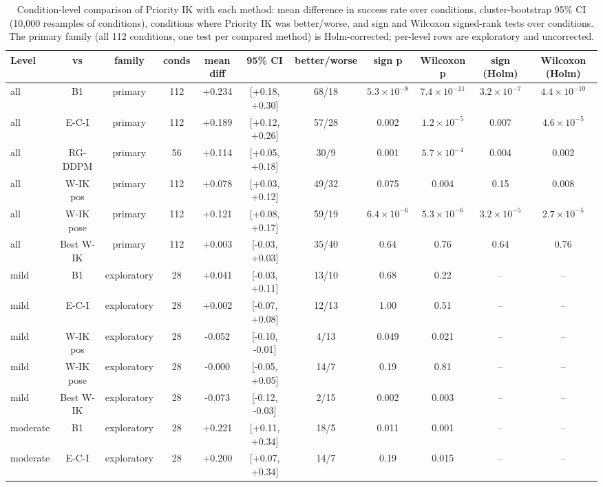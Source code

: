 \begin{table}[t]
\centering
\caption{Condition-level comparison of Priority IK with each method: mean difference in success rate over conditions, cluster-bootstrap 95\% CI (10{,}000 resamples of conditions), conditions where Priority IK was better/worse, and sign and Wilcoxon signed-rank tests over conditions. The primary family (all 112 conditions, one test per compared method) is Holm-corrected; per-level rows are exploratory and uncorrected.}
\label{tab:stats_condition}
\setlength{\tabcolsep}{3pt}
\begin{tabular}{lcccccccccc}
\toprule
Level & vs & family & conds & mean diff & 95\% CI & better/worse & sign p & Wilcoxon p & sign (Holm) & Wilcoxon (Holm) \\
\midrule
all & B1 & primary & 112 & +0.234 & [+0.18, +0.30] & 68/18 & $5.3\times10^{-8}$ & $7.4\times10^{-11}$ & $3.2\times10^{-7}$ & $4.4\times10^{-10}$ \\
all & E-C-I & primary & 112 & +0.189 & [+0.12, +0.26] & 57/28 & 0.002 & $1.2\times10^{-5}$ & 0.007 & $4.6\times10^{-5}$ \\
all & RG-DDPM & primary & 56 & +0.114 & [+0.05, +0.18] & 30/9 & 0.001 & $5.7\times10^{-4}$ & 0.004 & 0.002 \\
all & W-IK pos & primary & 112 & +0.078 & [+0.03, +0.12] & 49/32 & 0.075 & 0.004 & 0.15 & 0.008 \\
all & W-IK pose & primary & 112 & +0.121 & [+0.08, +0.17] & 59/19 & $6.4\times10^{-6}$ & $5.3\times10^{-6}$ & $3.2\times10^{-5}$ & $2.7\times10^{-5}$ \\
all & Best W-IK & primary & 112 & +0.003 & [-0.03, +0.03] & 35/40 & 0.64 & 0.76 & 0.64 & 0.76 \\
mild & B1 & exploratory & 28 & +0.041 & [-0.03, +0.11] & 13/10 & 0.68 & 0.22 & -- & -- \\
mild & E-C-I & exploratory & 28 & +0.002 & [-0.07, +0.08] & 12/13 & 1.00 & 0.51 & -- & -- \\
mild & W-IK pos & exploratory & 28 & -0.052 & [-0.10, -0.01] & 4/13 & 0.049 & 0.021 & -- & -- \\
mild & W-IK pose & exploratory & 28 & -0.000 & [-0.05, +0.05] & 14/7 & 0.19 & 0.81 & -- & -- \\
mild & Best W-IK & exploratory & 28 & -0.073 & [-0.12, -0.03] & 2/15 & 0.002 & 0.003 & -- & -- \\
moderate & B1 & exploratory & 28 & +0.221 & [+0.11, +0.34] & 18/5 & 0.011 & 0.001 & -- & -- \\
moderate & E-C-I & exploratory & 28 & +0.200 & [+0.07, +0.34] & 14/7 & 0.19 & 0.015 & -- & -- \\

\end{tabular}
\end{table}
